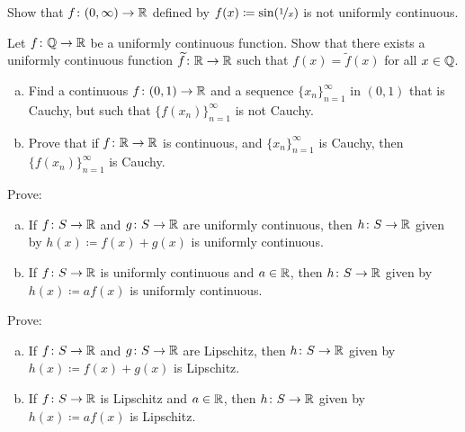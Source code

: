 \begin{exercise}
Show that $f \colon (0,\infty) \to {\mathbb{R}}$ defined by $f(x) \coloneqq \sin
(\nicefrac{1}{x})$ is not uniformly continuous.
\end{exercise}

\begin{exercise}[Challenging]
Let $f \colon {\mathbb{Q}} \to {\mathbb{R}}$ be a uniformly continuous function.  Show that
there exists a uniformly continuous function $\widetilde{f} \colon {\mathbb{R}} \to {\mathbb{R}}$
such that $f(x) = \widetilde{f}(x)$ for all $x \in {\mathbb{Q}}$.
\end{exercise}

\begin{samepage}
\begin{exercise}
\leavevmode
\begin{enumerate}[a)]
\item
Find a continuous $f \colon (0,1) \to {\mathbb{R}}$ and a sequence
$\{ x_n \}_{n=1}^\infty$ in
$(0,1)$ that is Cauchy, but such that $\bigl\{ f(x_n) \bigr\}_{n=1}^\infty$ is not Cauchy.
\item
Prove that if $f \colon {\mathbb{R}} \to {\mathbb{R}}$ is continuous,
and $\{ x_n \}_{n=1}^\infty$ is
Cauchy, then $\bigl\{ f(x_n) \bigr\}_{n=1}^\infty$ is Cauchy.
\end{enumerate}
\end{exercise}
\end{samepage}

\begin{samepage}
\begin{exercise}
Prove:
\begin{enumerate}[a)]
\item
If $f \colon S \to {\mathbb{R}}$ and $g \colon S \to {\mathbb{R}}$ are uniformly continuous,
then $h \colon S \to {\mathbb{R}}$ given by $h(x) \coloneqq f(x) + g(x)$
is uniformly continuous.
\item
If $f \colon S \to {\mathbb{R}}$ is uniformly continuous and $a \in {\mathbb{R}}$,
then $h \colon S \to {\mathbb{R}}$ given by $h(x) \coloneqq a f(x)$
is uniformly continuous.
\end{enumerate}
\end{exercise}
\end{samepage}

\begin{exercise}
Prove:
\begin{enumerate}[a)]
\item
If $f \colon S \to {\mathbb{R}}$ and $g \colon S \to {\mathbb{R}}$ are Lipschitz,
then $h \colon S \to {\mathbb{R}}$ given by $h(x) \coloneqq f(x) + g(x)$
is Lipschitz.
\item
If $f \colon S \to {\mathbb{R}}$ is Lipschitz and $a \in {\mathbb{R}}$,
then $h \colon S \to {\mathbb{R}}$ given by $h(x) \coloneqq a f(x)$
is Lipschitz.
\end{enumerate}
\end{exercise}


